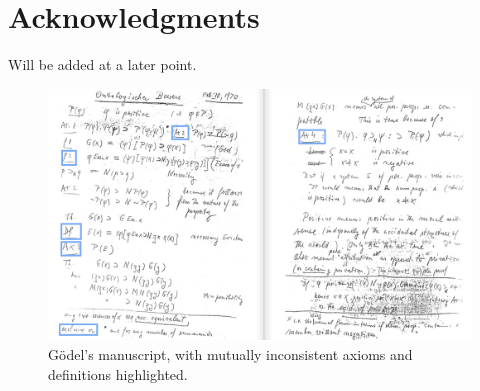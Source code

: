 \documentclass{article}
\begin{document}
\section*{Acknowledgments}

Will be added at a later point.



\begin{figure}
\centerline{\includegraphics[width=\textwidth]{./Images/Manuscript2.png}}
\caption{G\"{o}del's manuscript, with mutually inconsistent axioms and definitions highlighted.} \label{GoedelScript}
\end{figure}


\appendix




\end{document}
